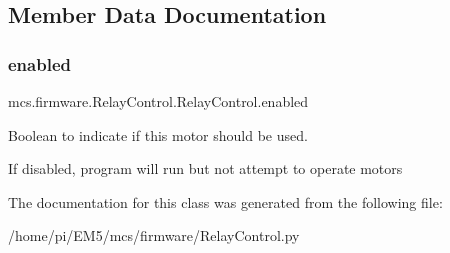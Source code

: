 \subsection{Member Data Documentation}
\mbox{\label{classmcs_1_1firmware_1_1RelayControl_1_1RelayControl_a9ae2c738456b71efdc1bb687daa69f83}} 
\subsubsection{\texorpdfstring{enabled}{enabled}}
{\footnotesize\ttfamily mcs.\+firmware.\+Relay\+Control.\+Relay\+Control.\+enabled}



Boolean to indicate if this motor should be used. 

If disabled, program will run but not attempt to operate motors 

The documentation for this class was generated from the following file\+:\begin{DoxyCompactItemize}
\item 
/home/pi/\+E\+M5/mcs/firmware/Relay\+Control.\+py\end{DoxyCompactItemize}
